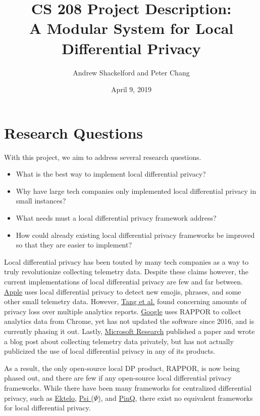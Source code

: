 \documentclass[12pt]{article}
\title{CS 208 Project Description:\\ A Modular System for Local Differential Privacy}
\author{Andrew Shackelford and Peter Chang}
\date{April 9, 2019}
\begin{document}
\maketitle

\section*{Research Questions}

\noindent

With this project, we aim to address several research questions.

\begin{itemize}
    \item What is the best way to implement local differential privacy?
    \item Why have large tech companies only implemented local differential privacy in small instances?
    \item What needs must a local differential privacy framework address?
    \item How could already existing local differential privacy frameworks be improved so that they are easier to implement?
\end{itemize}

Local differential privacy has been touted by many tech companies as a way to truly revolutionize collecting telemetry data. Despite these claims however, the current implementations of local differential privacy are few and far between. \href{https://machinelearning.apple.com/2017/12/06/learning-with-privacy-at-scale.html}{Apple} uses local differential privacy to detect new emojis, phrases, and some other small telemetry data. However, \href{https://arxiv.org/abs/1709.02753}{Tang et al.} found concerning amounts of privacy loss over multiple analytics reports. \href{https://github.com/google/rappor}{Google} uses RAPPOR to collect analytics data from Chrome, yet has not updated the software since 2016, and is currently phasing it out. Lastly, \href{https://www.microsoft.com/en-us/research/blog/collecting-telemetry-data-privately/}{Microsoft Research} published a paper and wrote a blog post about collecting telemetry data privately, but has not actually publicized the use of local differential privacy in any of its products.

\medskip

As a result, the only open-source local DP product, RAPPOR, is now being phased out, and there are few if any open-source local differential privacy frameworks. While there have been many frameworks for centralized differential privacy, such as \href{https://github.com/ektelo}{Ektelo}, \href{https://arxiv.org/abs/1609.04340}{Psi ($\Psi$)}, and \href{https://www.microsoft.com/en-us/research/project/privacy-integrated-queries-pinq/}{PinQ}, there exist no equivalent frameworks for local differential privacy.
\end{document}
